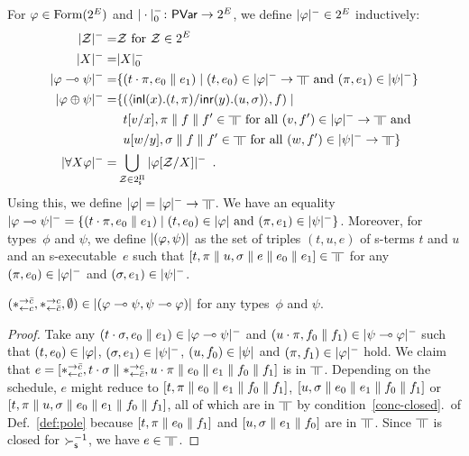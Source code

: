 For $\varphi\in\mathop{\text{Form}}(2^E)$ and $|\cdot|^-_0\colon\mathsf{PVar}\rightarrow 2^E$\kern
-2pt,
we define $|{\varphi}|^-\in
2^E$ inductively:
\begin{align*}
 \nsem{\mathcal Z} =& \mathcal Z \text{ for } \mathcal Z\in 2^E\\
 \nsem{X}=& |X|_0^- \\
 \nsem{\phi\limp\psi}=&
 \{(t\cdot\pi, e_0\conc e_1)\mid
 (t,e_0)\in\nsem\phi\rightarrow\bbot \text{ and }(\pi,e_1)\in\nsem\psi\}\\
\nsem{\phi\oplus\psi}=& \{(\mats x{t}{\pi}y{u}{\sigma}, f)\mid\\ &
\,\,\,  t[v/x],\pi\conc f\conc f'\in\bbot \text{ for all } (v,f')\in\nsem{\phi}\rightarrow\bbot\text{
 and }\\ &
\,\,\, u[w/y],\sigma\conc f\conc f'\in\bbot \text{ for all } (w,f')\in\nsem{\psi}\rightarrow\bbot\}
 \\
 \nsem{\forall X\phi}=&
 \bigcup_{\mathcal Z\in 2^\sPi} \nsem{\phi[\mathcal Z/X]}\enspace.
\end{align*}
Using this, we define $\sem \phi=\nsem{\phi}\rightarrow\bbot$.
We have an equality
$|{\varphi\multimap\psi}|^- = \{(t\cdot\pi, e_0\parallel e_1)\mid
(t,e_0)\in|{\varphi}|\text{ and }(\pi,e_1)\in|{\psi}|^-\}$.
Moreover, for types~$\phi$ and $\psi$, we define $|{(\varphi,\psi)}|$
as the set of triples $(t,u,e)$ of s-terms $t$ and $u$ and an s-executable~$e$
such
that
$[t,\pi\conc u,\sigma\conc e\conc e_0\conc e_1]
\in\bbot$ for any $(\pi,e_0)\in|{\varphi}|^-$
and $(\sigma,e_1)\in|{\psi}|^-$.

\begin{proposition}
 \label{comod-type}
 $(\ast^{\rightarrow {\bar{c}}}_{\leftarrow{c}},\ast^{\rightarrow {c}}_{\leftarrow{\bar{c}}},\emptyset)\in|{(\varphi\multimap\psi,\psi\multimap\varphi)}|$
 for any types~$\phi$ and $\psi$.
\end{proposition}
\begin{proof}
 Take any $(t\cdot\sigma,e_{0}\parallel e_{1})\in|{\varphi\multimap\psi}|^-$
 and $(u\cdot\pi,f_{0}\parallel f_{1})\in|{\psi\multimap\varphi}|^-$ such that
 $(t, e_{0})\in|{\varphi}|$, $(\sigma,e_{1})\in|{\psi}|^-$,
 $(u, f_{0})\in|{\psi}|$ and $(\pi,f_{1})\in|{\varphi}|^-$ hold.
 We claim that $e=[\ast^{\rightarrow {\bar{c}}}_{\leftarrow{c}},t\cdot\sigma\parallel\ast^{\rightarrow {c}}_{\leftarrow{\bar{c}}},u\cdot\pi\parallel
 e_{0}\parallel e_{1}\parallel f_{0}\parallel f_{1}]$ is in
 $\bbot$.
 Depending on the schedule, $e$ might reduce to
 $ [t,\pi\parallel e_{0}\parallel e_{1}\parallel f_{0}\parallel f_{1}]$,
 $ [u,\sigma\parallel e_{0}\parallel e_{1}\parallel f_{0}\parallel f_{1}]$ or
 $ [t,\pi\parallel u,\sigma\parallel e_{0}\parallel e_{1}\parallel f_{0}\parallel f_{1}]$,
 all of which are in $\bbot$ by condition~\ref{conc-closed}.~of
 Def.~\ref{def:pole} because
 $[t,\pi\parallel e_{0}\parallel f_{1}]$ and
 $[u,\sigma\parallel e_{1}\parallel f_{0}]$ are in $\bbot$.
 Since $\bbot$ is closed for $\succ_{\mathsf s}^{-1}$,
 we have $e\in\bbot$.
\end{proof}

